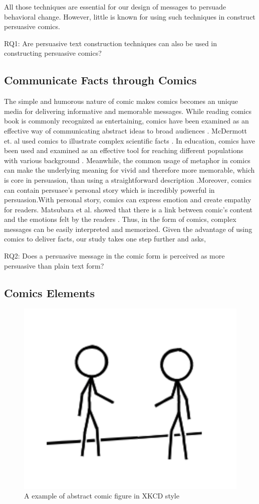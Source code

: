 \begin{description}
\end{description}
All those techniques are essential for our design of messages to persuade behavioral change. However, little is known for using such techniques in construct persuasive comics.

RQ1: Are persuasive text construction techniques can also be used in constructing persuasive comics?

\subsection{Communicate Facts through Comics}
The simple and humorous nature of comic makes comics becomes an unique media for delivering informative and memorable messages. While reading comics book is commonly recognized as entertaining, comics have been examined as an effective way of communicating abstract ideas to broad audiences \cite{McDermottPB18,cary2004going,scott1993understanding}. McDermott et. al used comics to illustrate complex scientific facts \cite{McDermottPB18}. In education, comics have been used and examined as an effective tool for reaching different populations with various background \cite{McDermottPB18,cary2004going,scott1993understanding}. Meanwhile, the common usage of metaphor in comics can make the underlying meaning for vivid and therefore more memorable, which is core in persuasion, than using a straightforward description \cite{McDermottPB18,scott1993understanding}.Moreover, comics can contain persuaee's personal story which is incredibly powerful in persuasion\cite{weaver2017losing}.With personal story, comics can express emotion and create empathy for readers. Matsubara et al. showed that there is a link between comic's content and the emotions felt by the readers \cite{matsubara2016emotional}. Thus, in the form of comics, complex messages can be easily interpreted and memorized. Given the advantage of using comics to deliver facts, our study takes one step further and asks,

RQ2: Does a persuasive message in the comic form is perceived as more persuasive than plain text form?

\subsection{Comics Elements}
\begin{figure}
  \centering
  \includegraphics[width=0.3\columnwidth]{figures/xkcd_example}
  \caption{A example of abstract comic figure in XKCD style}
  \label{fig:xkcd}
\end{figure}

